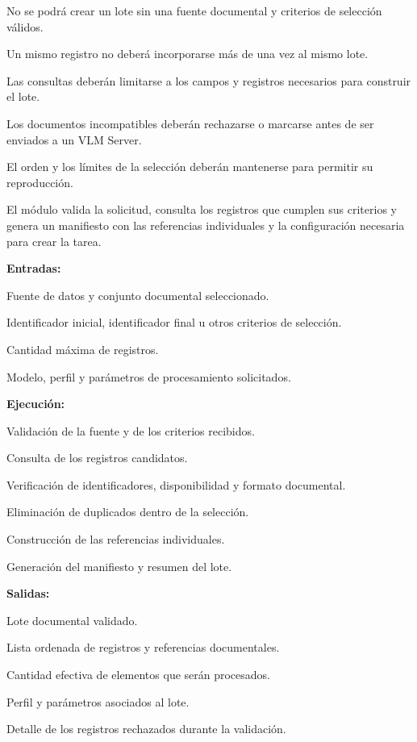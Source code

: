 \begin{definicionmodulo}
\item[Restricciones]
\begin{elementosmodulo}
    \item No se podrá crear un lote sin una fuente documental y criterios de selección válidos.
    \item Un mismo registro no deberá incorporarse más de una vez al mismo lote.
    \item Las consultas deberán limitarse a los campos y registros necesarios para construir el lote.
    \item Los documentos incompatibles deberán rechazarse o marcarse antes de ser enviados a un VLM Server.
    \item El orden y los límites de la selección deberán mantenerse para permitir su reproducción.
\end{elementosmodulo}

\item[Estructura general] El módulo valida la solicitud, consulta los registros que cumplen sus criterios y genera un manifiesto con las referencias individuales y la configuración necesaria para crear la tarea.

\textbf{Entradas:}
\begin{elementosmodulo}
    \item Fuente de datos y conjunto documental seleccionado.
    \item Identificador inicial, identificador final u otros criterios de selección.
    \item Cantidad máxima de registros.
    \item Modelo, perfil y parámetros de procesamiento solicitados.
\end{elementosmodulo}

\textbf{Ejecución:}
\begin{elementosmodulo}
    \item Validación de la fuente y de los criterios recibidos.
    \item Consulta de los registros candidatos.
    \item Verificación de identificadores, disponibilidad y formato documental.
    \item Eliminación de duplicados dentro de la selección.
    \item Construcción de las referencias individuales.
    \item Generación del manifiesto y resumen del lote.
\end{elementosmodulo}

\textbf{Salidas:}
\begin{elementosmodulo}
    \item Lote documental validado.
    \item Lista ordenada de registros y referencias documentales.
    \item Cantidad efectiva de elementos que serán procesados.
    \item Perfil y parámetros asociados al lote.
    \item Detalle de los registros rechazados durante la validación.
\end{elementosmodulo}

\end{definicionmodulo}


